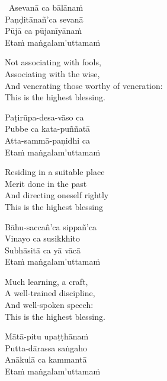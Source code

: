 \begin{pali-hang}
  \anglebracketleft\ \hspace{-0.5mm}Asevanā ca bālānaṁ \hspace{-0.5mm}\anglebracketright\ \\
  Paṇḍitānañ'ca sevanā\\
  Pūjā ca pūjanīyānaṁ\\
  Etaṁ maṅgalam'uttamaṁ
\end{pali-hang}

\begin{english-verses}
  Not associating with fools,\\
  Associating with the wise,\\
  And venerating those worthy of veneration:\\
  This is the highest blessing.
\end{english-verses}

\begin{pali-hang-continued}
  Paṭirūpa-desa-vāso ca\\
  Pubbe ca kata-puññatā\\
  Atta-sammā-paṇidhi ca\\
  Etaṁ maṅgalam'uttamaṁ
\end{pali-hang-continued}

\begin{english-verses}
  Residing in a suitable place\\
  Merit done in the past\\
  And directing oneself rightly\\
  This is the highest blessing
\end{english-verses}

\begin{pali-hang-continued}
  Bāhu-saccañ'ca sippañ'ca\\
  Vinayo ca susikkhito\\
  Subhāsitā ca yā vācā\\
  Etaṁ maṅgalam'uttamaṁ
\end{pali-hang-continued}

\begin{english-verses}
  Much learning, a craft,\\
  A well-trained discipline,\\
  And well-spoken speech:\\
  This is the highest blessing.
\end{english-verses}

\begin{pali-hang-continued}
  Mātā-pitu upaṭṭhānaṁ\\
  Putta-dārassa saṅgaho\\
  Anākulā ca kammantā\\
  Etaṁ maṅgalam'uttamaṁ
\end{pali-hang-continued}

